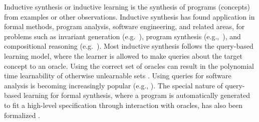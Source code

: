 
Inductive synthesis or inductive learning 
is the synthesis of programs (concepts) from examples or other observations. 
Inductive synthesis has found application in formal methods, program analysis,
software engineering, and related areas, for problems such as 
invariant generation (e.g.~\cite{garg2014ice}),
program synthesis (e.g.,~\cite{solar2006combinatorial}),
and compositional reasoning (e.g.~\cite{cobleigh2003learning}).
Most inductive synthesis follows the query-based learning model, where the
learner is allowed to make queries about the target concept to an oracle. 
Using the correct set of oracles can result in the polynomial time learnability of otherwise unlearnable sets \cite{angluin1988queries}. 
Using queries for software analysis is becoming increasingly popular (e.g., \cite{vaandrager17,howar2018active}).
The special nature of query-based learning for formal synthesis, where a program is automatically generated to fit a high-level specification through interaction with oracles,
has also been formalized \cite{jha2017theory}. 


